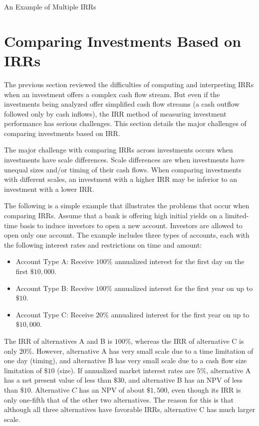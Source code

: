 \documentclass[11pt]{article}
\begin{document}
An Example of Multiple IRRs

\section*{Comparing Investments Based on IRRs}
The previous section reviewed the difficulties of computing and interpreting IRRs when an investment offers a complex cash flow stream. But even if the investments being analyzed offer simplified cash flow streams (a cash outflow followed only by cash inflows), the IRR method of measuring investment performance has serious challenges. This section details the major challenges of comparing investments based on IRR.

The major challenge with comparing IRRs across investments occurs when investments have scale differences. Scale differences are when investments have unequal sizes and/or timing of their cash flows. When comparing investments with different scales, an investment with a higher IRR may be inferior to an investment with a lower IRR.

The following is a simple example that illustrates the problems that occur when comparing IRRs. Assume that a bank is offering high initial yields on a limited-time basis to induce investors to open a new account. Investors are allowed to open only one account. The example includes three types of accounts, each with the following interest rates and restrictions on time and amount:

\begin{itemize}
  \item Account Type A: Receive $100 \%$ annualized interest for the first day on the first $\$ 10,000$.
  \item Account Type B: Receive $100 \%$ annualized interest for the first year on up to $\$ 10$.
  \item Account Type C: Receive $20 \%$ annualized interest for the first year on up to $\$ 10,000$.
\end{itemize}

The IRR of alternatives A and B is $100 \%$, whereas the IRR of alternative C is only $20 \%$. However, alternative A has very small scale due to a time limitation of one day (timing), and alternative B has very small scale due to a cash flow size limitation of $\$ 10$ (size). If annualized market interest rates are $5 \%$, alternative A has a net present value of less than $\$ 30$, and alternative B has an NPV of less than $\$ 10$. Alternative $C$ has an NPV of about $\$ 1,500$, even though its IRR is only one-fifth that of the other two alternatives. The reason for this is that although all three alternatives have favorable IRRs, alternative $\mathrm{C}$ has much larger scale.
\end{document}
